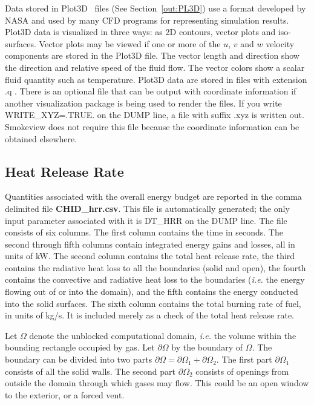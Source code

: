 \documentclass[11pt]{book}
\begin{document}
Data stored in Plot3D~\cite{PLOT3D} files (See Section~\ref{out:PL3D}) use a format developed by
NASA and used by many CFD programs for representing simulation results.
Plot3D data is visualized in three ways: as 2D contours, vector plots and iso-surfaces.
Vector plots may be viewed if one or more of the $u$, $v$ and $w$
velocity components are stored in the Plot3D file. The vector
length and direction show the direction and relative speed of the
fluid flow. The vector colors show a scalar fluid quantity such as
temperature.
Plot3D data are stored in files with extension {\ct .q} . There is
an optional file that can be output with coordinate information
if another visualization package is being used to render the
files. If you write {\ct WRITE\_XYZ=.TRUE.} on the {\ct DUMP}
line, a file with suffix {\ct .xyz} is written out. Smokeview
does not require this file because the coordinate information can be
obtained elsewhere.



\subsection{Heat Release Rate}
\label{info:HRR}

Quantities associated with the overall energy budget are
reported in the comma delimited
file {\bf CHID\_hrr.csv}. This file is automatically generated; the only input parameter associated with it is
{\ct DT\_HRR} on the {\ct DUMP} line. The file consists of six columns.
The first column contains the time in seconds. The second through
fifth columns contain integrated energy gains and losses, all in
units of kW. The second column contains
the total heat release rate, the third contains the
radiative heat loss to all the boundaries (solid and open), the fourth contains the
convective and radiative heat loss to the boundaries ({\em i.e.} the energy
flowing out of or into the domain), and the fifth contains the energy conducted
into the solid surfaces.
The sixth column contains the total burning rate of fuel, in units of kg/s. It is included merely as a check
of the total heat release rate.

Let $\Omega$ denote the unblocked computational domain, {\em i.e.} the volume within the bounding rectangle
occupied by gas. Let $\partial \Omega$ by the boundary of $\Omega$. The boundary can be divided into two parts
$\partial \Omega = \partial \Omega_1 + \partial \Omega_2$. The first part $\partial \Omega_1$ consists of all the solid
walls. The second part $\partial \Omega_2$ consists of openings from outside the domain through which gases may flow. This
could be an open window to the exterior, or a forced vent.
\end{document}

